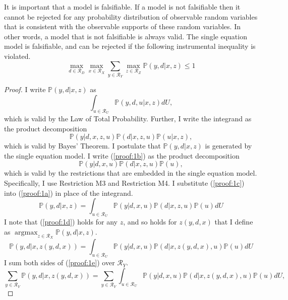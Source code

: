 \documentclass[12pt,a4paper,twoside]{article}
\DeclareMathOperator*{\argmax}{argmax}
\numberwithin{equation}{section}
\begin{document}
It is important that a model is falsifiable. If a model is not falsifiable then it cannot be rejected for any probability distribution of observable random variables that is consistent with the observable supports of these random variables. In other words, a model that is not falsifiable is always valid. The single equation model is falsifiable, and can be rejected if the following instrumental inequality is violated.
\begin{equation}
\max_{d\in\mathcal{R}_D}\max_{x\in\mathcal{R}_X}\sum_{y\in\mathcal{R}_Y}\max_{z\in\mathcal{R}_Z}\mathbb{P}(y,d|x,z)\leq 1\label{eq:false}
\end{equation}
\vspace{20pt} 
\begin{proof}
I write $\mathbb{P}(y,d|x,z)$ as 
\begin{equation}
\int_{u\in\mathcal{R}_U}\mathbb{P}(y,d,u|x,z)dU,\label{proof:1a}
\end{equation}
which is valid by the Law of Total Probability. Further, I write the integrand as the product decomposition 
\begin{equation}
\mathbb{P}(y|d,x,z,u)\mathbb{P}(d|x,z,u)\mathbb{P}(u|x,z),\label{proof:1b}
\end{equation}
which is valid by Bayes' Theorem. I postulate that $\mathbb{P}(y,d|x,z)$ is generated by the single equation model. I write (\ref{proof:1b}) as the product decomposition
\begin{equation}
\mathbb{P}(y|d,x,u)\mathbb{P}(d|x,z,u)\mathbb{P}(u),\label{proof:1c}
\end{equation}
which is valid by the restrictions that are embedded in the single equation model. Specifically, I use Restriction M3 and Restriction M4. I substitute (\ref{proof:1c}) into (\ref{proof:1a}) in place of the integrand. 
\begin{equation}
\mathbb{P}(y,d|x,z)=\int_{u\in\mathcal{R}_U}\mathbb{P}(y|d,x,u)\mathbb{P}(d|x,z,u)\mathbb{P}(u)dU\label{proof:1d}
\end{equation}
I note that (\ref{proof:1d}) holds for any $z$, and so holds for $z(y,d,x)$ that I define as $\argmax_{z\in\mathcal{R}_X}\mathbb{P}(y,d|x,z)$. 
\begin{equation}
\mathbb{P}(y,d|x,z(y,d,x))=\int_{u\in\mathcal{R}_U}\mathbb{P}(y|d,x,u)\mathbb{P}(d|x,z(y,d,x),u)\mathbb{P}(u)dU\label{proof:1e}
\end{equation}
I sum both sides of (\ref{proof:1e}) over $\mathcal{R}_Y$.
\begin{equation}
\sum_{y\in\mathcal{R}_Y}\mathbb{P}(y,d|x,z(y,d,x))=\sum_{y\in\mathcal{R}_Y}\int_{u\in\mathcal{R}_U}\mathbb{P}(y|d,x,u)\mathbb{P}(d|x,z(y,d,x),u)\mathbb{P}(u)dU\nonumber,

\end{equation}
\end{proof}
\end{document}
